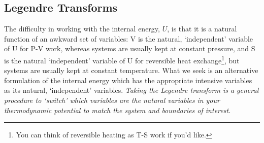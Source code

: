 \documentclass[12pt]{article}
\begin{document}


\subsection{Legendre Transforms} \label{LegendreTransforms}
The difficulty in working with the internal energy, $U$, is that it is a natural function of an awkward set of variables: V is the natural, `independent' variable of U for P-V work, whereas systems are usually kept at constant pressure, and S is the natural `independent' variable of U for reversible heat exchange\footnote{You can think of reversible heating as T-S work if you'd like.}, but systems are usually kept at constant temperature. What we seek is an alternative formulation of the internal energy which has the appropriate intensive variables as its natural, `independent' variables. \emph{Taking the Legendre transform is a general procedure to `switch' which variables are the natural variables in your thermodynamic potential to match the system and boundaries of interest.}\\
\end{document}
